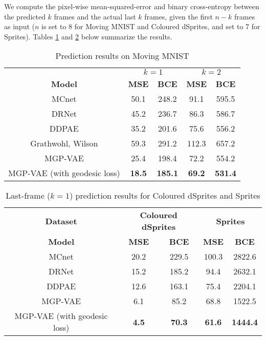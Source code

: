\documentclass[runningheads]{llncs}
\begin{document}
   We compute the pixel-wise mean-squared-error and binary cross-entropy between the predicted $k$ frames and the actual last $k$ frames, given the first $n-k$ frames as input ($n$ is set to 8 for Moving MNIST and Coloured dSprites, and set to 7 for Sprites). Tables \ref{mse_bce_mnist} and \ref{mse_bce_dsprites} below summarize the results. \par
   


   \begin{table}[H]
      \centering
      \caption{Prediction results on Moving MNIST}        
		\begin{tabular}{ccccc} \hline 
		    \label{mse_bce_mnist}
			& \multicolumn{2}{c}{$k = 1$} 
			& \multicolumn{2}{c}{$k = 2$}  \\ \cmidrule(lr){2-3} \cmidrule(lr){4-5}				
			\textbf{Model} & \textbf{MSE} & \textbf{BCE} & \textbf{MSE} & \textbf{BCE} \\ \hline					
			MCnet \cite{Villegas2017DecomposingMA} & 50.1 & 248.2 & 91.1 & 595.5 \\		
			DRNet \cite{Denton2017UnsupervisedLO} & 45.2 & 236.7 & 86.3 & 586.7 \\		
			DDPAE \cite{Hsieh2018LearningTD} & 35.2 & 201.6 & 75.6 & 556.2 \\		
			Grathwohl, Wilson \cite{Grathwohl2016DisentanglingSA} & 59.3 & 291.2 & 112.3 & 657.2 \\		
			MGP-VAE & 25.4 & 198.4 & 72.2 & 554.2 \\		
			MGP-VAE (with geodesic loss) & \textbf{18.5} & \textbf{185.1} & \textbf{69.2} & \textbf{531.4} \\ \hline
      \end{tabular}
	\end{table}

  \begin{table}[!htb]
      \centering
        \caption{Last-frame ($k = 1$) prediction results for Coloured dSprites and Sprites}        
        \begin{tabular}{ccccc} \hline       
          \label{mse_bce_dsprites}
          \textbf{Dataset} & \multicolumn{2}{c}{\textbf{Coloured dSprites}} 
          & \multicolumn{2}{c}{\textbf{Sprites}}  \\ \cmidrule(lr){2-3} \cmidrule(lr){4-5}          
          \textbf{Model} & \textbf{MSE} & \textbf{BCE} & \textbf{MSE} & \textbf{BCE} \\ \hline               
          MCnet \cite{Villegas2017DecomposingMA} & 20.2 & 229.5  & 100.3 & 2822.6 \\          
          DRNet \cite{Denton2017UnsupervisedLO} & 15.2 & 185.2 & 94.4 & 2632.1 \\       
          DDPAE \cite{Hsieh2018LearningTD} & 12.6 & 163.1 & 75.4 & 2204.1 \\      
          MGP-VAE & 6.1 & 85.2 & 68.8 & 1522.5 \\      
          MGP-VAE (with geodesic loss) & \textbf{4.5} & \textbf{70.3} & \textbf{61.6} & \textbf{1444.4} \\ \hline 
          \end{tabular}
\end{table}
   
\end{document}

